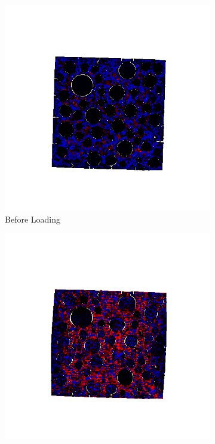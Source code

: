 \begin{figure}[ht]
\centering

    \begin{subfigure}{.33\textwidth}
      \centering
      \includegraphics[width=1.0\linewidth]{Files/A30X-5C_3_IS/DEP50-STEP(020).png}
      \caption{Before Loading}
    \end{subfigure}%
    \begin{subfigure}{.33\textwidth}
      \centering
      \includegraphics[width=1.0\linewidth]{Files/A30X-5C_3_IS/DEP50-STEP(040).png}

\end{subfigure}
\end{figure}
